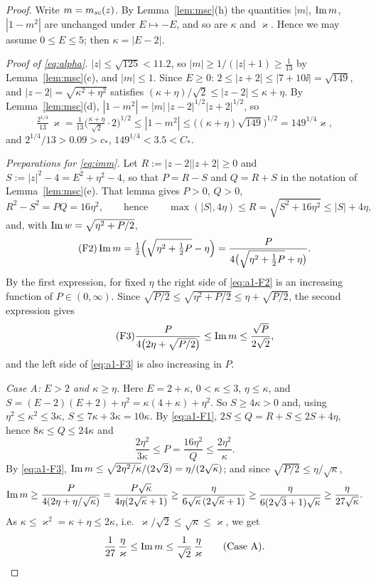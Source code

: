 \begin{proof}
Write $m=m_{sc}(z)$. By Lemma~\ref{lem:msc}(h) the quantities $|m|$, $\operatorname{Im} m$, $|1-m^2|$ are unchanged under $E\mapsto-E$, and so are $\kappa$ and $\varkappa$. Hence we may assume $0\le E\le5$; then $\kappa=|E-2|$.

\emph{Proof of \eqref{eq:alpha}.} $|z|\le\sqrt{125}<11.2$, so $|m|\ge1/(|z|+1)\ge\frac1{13}$ by Lemma~\ref{lem:msc}(c), and $|m|\le1$. Since $E\ge0$: $2\le|z+2|\le|7+10\ii|=\sqrt{149}$, and $|z-2|=\sqrt{\kappa^2+\eta^2}$ satisfies
$(\kappa+\eta)/\sqrt2\le|z-2|\le\kappa+\eta$. By Lemma~\ref{lem:msc}(d), $|1-m^2|=|m|\,|z-2|^{1/2}|z+2|^{1/2}$, so
\[
 \tfrac{2^{1/4}}{13}\,\varkappa=\tfrac1{13}\big(\tfrac{\kappa+\eta}{\sqrt2}\cdot2\big)^{1/2}\le|1-m^2|\le\big((\kappa+\eta)\sqrt{149}\big)^{1/2}=149^{1/4}\varkappa,
\]
and $2^{1/4}/13>0.09>c_*$, $149^{1/4}<3.5<C_*$.

\emph{Preparations for \eqref{eq:imm}.} Let $R:=|z-2||z+2|\ge0$ and $S:=|z|^2-4=E^2+\eta^2-4$, so that $P=R-S$ and $Q=R+S$ in the notation of Lemma~\ref{lem:msc}(e). That lemma gives $P>0$, $Q>0$,
\begin{equation}\tag{F1}\label{eq:a1-F1}
 R^2-S^2=PQ=16\eta^2,\qquad\text{hence}\qquad \max(|S|,4\eta)\le R=\sqrt{S^2+16\eta^2}\le|S|+4\eta,
\end{equation}
and, with $\operatorname{Im} w=\sqrt{\eta^2+P/2}$,
\begin{equation}\tag{F2}\label{eq:a1-F2}
 \operatorname{Im} m=\tfrac12\Big(\sqrt{\eta^2+\tfrac12P}-\eta\Big)=\frac{P}{4\big(\sqrt{\eta^2+\frac12P}+\eta\big)} .
\end{equation}
By the first expression, for fixed $\eta$ the right side of \eqref{eq:a1-F2} is an increasing function of $P\in(0,\infty)$. Since $\sqrt{P/2}\le\sqrt{\eta^2+P/2}\le\eta+\sqrt{P/2}$, the second expression gives
\begin{equation}\tag{F3}\label{eq:a1-F3}
 \frac{P}{4\big(2\eta+\sqrt{P/2}\big)}\le\operatorname{Im} m\le\frac{\sqrt P}{2\sqrt2},
\end{equation}
and the left side of \eqref{eq:a1-F3} is also increasing in $P$.

\emph{Case A: $E>2$ and $\kappa\ge\eta$.} Here $E=2+\kappa$, $0<\kappa\le3$, $\eta\le\kappa$, and $S=(E-2)(E+2)+\eta^2=\kappa(4+\kappa)+\eta^2$. So $S\ge4\kappa>0$ and, using $\eta^2\le\kappa^2\le3\kappa$, $S\le7\kappa+3\kappa=10\kappa$.
By \eqref{eq:a1-F1}, $2S\le Q=R+S\le2S+4\eta$, hence $8\kappa\le Q\le24\kappa$ and
\[
 \frac{2\eta^2}{3\kappa}\le P=\frac{16\eta^2}{Q}\le\frac{2\eta^2}{\kappa} .
\]
By \eqref{eq:a1-F3}, $\operatorname{Im} m\le\sqrt{2\eta^2/\kappa}/(2\sqrt2)=\eta/(2\sqrt\kappa)$; and since $\sqrt{P/2}\le\eta/\sqrt\kappa$,
\[
 \operatorname{Im} m\ge\frac{P}{4(2\eta+\eta/\sqrt\kappa)}=\frac{P\sqrt\kappa}{4\eta(2\sqrt\kappa+1)}\ge\frac{\eta}{6\sqrt\kappa\,(2\sqrt\kappa+1)}\ge\frac{\eta}{6(2\sqrt3+1)\sqrt\kappa}\ge\frac{\eta}{27\sqrt\kappa} .
\]
As $\kappa\le\varkappa^2=\kappa+\eta\le2\kappa$, i.e.\ $\varkappa/\sqrt2\le\sqrt\kappa\le\varkappa$, we get
\[
 \frac1{27}\,\frac\eta\varkappa\le\operatorname{Im} m\le\frac1{\sqrt2}\,\frac\eta\varkappa\qquad(\text{Case A}).
\]


\end{proof}
